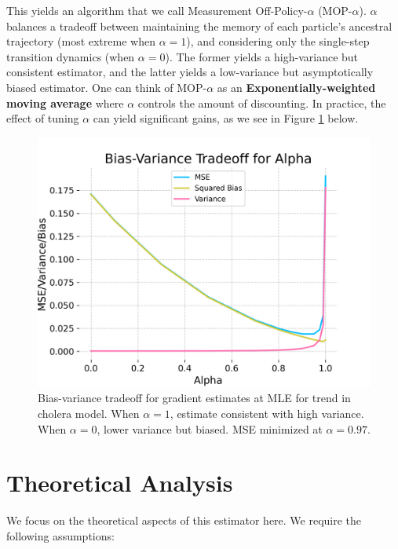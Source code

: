 \documentclass{article}
\begin{document}
This yields an algorithm that we call Measurement Off-Policy-$\alpha$ (MOP-$\alpha$). $\alpha$ balances a tradeoff between maintaining the memory of each particle's ancestral trajectory (most extreme when $\alpha=1$), and considering only the single-step transition dynamics (when $\alpha=0$). The former yields a high-variance but consistent estimator, and the latter yields a low-variance but asymptotically biased estimator. One can think of MOP-$\alpha$ as an \textbf{Exponentially-weighted moving average} where $\alpha$ controls the amount of discounting. In practice, the effect of tuning $\alpha$ can yield significant gains, as we see in Figure \ref{fig:bias-variance} below. 

\begin{figure}[H]
    \centering
    \includegraphics[scale=0.45]{imgs/095/biasvar.png}
    \caption{Bias-variance tradeoff for gradient estimates at MLE for trend in \cite{king08} cholera model. When $\alpha=1$, estimate consistent with high variance. When $\alpha=0$, lower variance but biased. MSE minimized at $\alpha=0.97$.}
    \label{fig:bias-variance}
\end{figure}

\section{Theoretical Analysis}

We focus on the theoretical aspects of this estimator here. We require the following assumptions:
\end{document}
